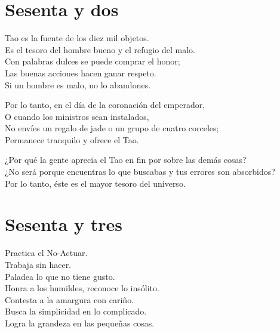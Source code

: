 \documentclass[book,b5paper,hidelinks,final]{memoir}
\begin{document}
	\chapter*{Sesenta y dos}
	
	Tao es la fuente de los diez mil objetos.\\
	Es el tesoro del hombre bueno y el refugio del malo.\\
	Con palabras dulces se puede comprar el honor;\\
	Las buenas acciones hacen ganar respeto.\\
	Si un hombre es malo, no lo abandones.
	
	Por lo tanto, en el día de la coronación del emperador,\\
	O cuando los ministros sean instalados,\\
	No envíes un regalo de jade o un grupo de cuatro corceles;\\
	Permanece tranquilo y ofrece el Tao.
	
	¿Por qué la gente aprecia el Tao en fin por sobre las demás cosas?\\
	¿No será porque encuentras lo que buscabas y tus errores son
	absorbidos?\\
	Por lo tanto, éste es el mayor tesoro del universo.
	
	\chapter*{Sesenta y tres}
	
	Practica el No-Actuar.\\
	Trabaja sin hacer.\\
	Paladea lo que no tiene gusto.\\
	Honra a los humildes, reconoce lo insólito.\\
	Contesta a la amargura con cariño.\\
	Busca la simplicidad en lo complicado.\\
	Logra la grandeza en las pequeñas cosas.
	
\end{document}
